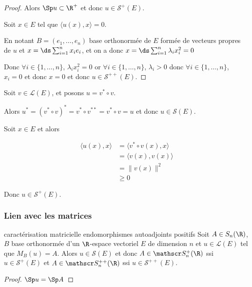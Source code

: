 \begin{proof}
    Alors $\Sp u \subset \R^+$ et donc $u \in \mathscr S^+(E)$.

    Soit $x \in E$ tel que $\langle u(x), x \rangle = 0$.

    En notant $B = (e_1, \dots, e_n)$ base orthonormée de $E$ formée de vecteurs propres de $u$
    et $x = \ds \sum_{i = 1}^{n} x_i e_i$, et on a donc $x = \ds \sum_{i = 1}^{n} \lambda_i x_i^2 = 0$

    Donc $\forall i \in \{1, \dots, n\}$, $\lambda_i x_i^2 = 0$ or 
    $\forall i \in \{1, \dots, n\}$, $\lambda_i > 0$ donc $\forall i \in \{1, \dots, n\}$, $x_i = 0$ et donc $x = 0$
    et donc $u \in \mathscr S^{++}(E)$.
\end{proof}


\begin{exemple}
    Soit $v \in \mathscr L(E)$, et posons $u = v^* \circ v$. 

    Alors $u^* = (v^* \circ v)^* = v^* \circ v^{**} = v^* \circ v = u$ et donc $u \in \mathscr S(E)$.


    Soit $x \in E$ et alors 

    \begin{align}
        \langle u(x), x \rangle & = \langle v^* \circ v (x), x \rangle \\
        & = \langle v(x), v(x) \rangle \\
        & = \| v(x) \|^2 \\
        & \geqslant 0
    \end{align}

    Donc $u \in \mathscr S^+(E)$. 
\end{exemple}

\subsubsection{Lien avec les matrices}

\begin{propositionnt}{caractérisation matricielle endomorphismes autoadjoints positifs}{}
    Soit $A \in S_n(\R)$, $B$ base orthonormée d'un $\R$-espace vectoriel $E$ de dimension 
    $n$ et $u \in \mathscr L(E)$ tel que $M_B(u) = A$. 
    Alors $u \in \mathscr S(E)$ et donc $A \in \mathscr S_n^+(\R)$ ssi $u \in \mathscr S^+(E)$ et $A \in \mathscr S_n^{++}(\R)$ ssi $u \in \mathscr S^{++}(E)$.
\end{propositionnt}

\begin{proof}
    $\Sp u = \Sp A$ 
\end{proof}


